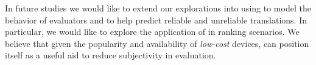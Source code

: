 \documentclass[11pt,a4paper]{article}
\begin{document}
In future studies we would like to extend our explorations into using \eye to model the behavior of evaluators and to help predict reliable and unreliable translations.  In particular, we would like to explore the application of \eye in ranking scenarios. We believe that given the popularity and availability of \emph{low-cost} devices, \eye can position itself as a useful aid to reduce subjectivity in evaluation.%


\pagebreak


\end{document}

